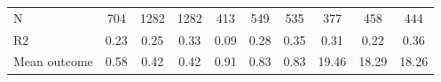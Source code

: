 \begin{tabular}{lccc|ccc|ccc}
N           &         704         &        1282         &        1282         &         413         &         549         &         535         &         377         &         458         &         444         \\
R2          &        0.23         &        0.25         &        0.33         &        0.09         &        0.28         &        0.35         &        0.31         &        0.22         &        0.36         \\
Mean outcome&        0.58         &        0.42         &        0.42         &        0.91         &        0.83         &        0.83         &       19.46         &       18.29         &       18.26         \\
\bottomrule \end{tabular}
